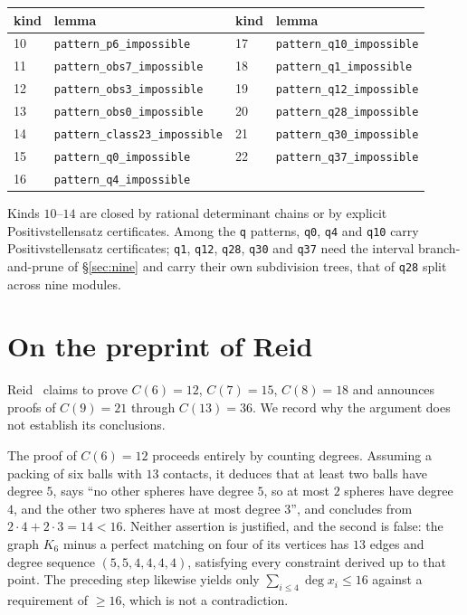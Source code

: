 \documentclass[11pt,a4paper]{article}
\theoremstyle{plain}
\theoremstyle{definition}
\begin{document}
\begin{center}
\small
\begin{tabular}{ll@{\qquad}ll}
\toprule
kind & lemma & kind & lemma \\
\midrule
10 & \texttt{pattern\_p6\_impossible}      & 17 & \texttt{pattern\_q10\_impossible} \\
11 & \texttt{pattern\_obs7\_impossible}    & 18 & \texttt{pattern\_q1\_impossible} \\
12 & \texttt{pattern\_obs3\_impossible}    & 19 & \texttt{pattern\_q12\_impossible} \\
13 & \texttt{pattern\_obs0\_impossible}    & 20 & \texttt{pattern\_q28\_impossible} \\
14 & \texttt{pattern\_class23\_impossible} & 21 & \texttt{pattern\_q30\_impossible} \\
15 & \texttt{pattern\_q0\_impossible}      & 22 & \texttt{pattern\_q37\_impossible} \\
16 & \texttt{pattern\_q4\_impossible}      &    & \\
\bottomrule
\end{tabular}
\end{center}

\noindent Kinds $10$--$14$ are closed by rational determinant chains or by explicit
Positivstellensatz certificates. Among the \texttt{q} patterns, \texttt{q0},
\texttt{q4} and \texttt{q10} carry Positivstellensatz certificates; \texttt{q1},
\texttt{q12}, \texttt{q28}, \texttt{q30} and \texttt{q37} need the interval
branch-and-prune of \S\ref{sec:nine} and carry their own subdivision trees, that of
\texttt{q28} split across nine modules.

\section{On the preprint of Reid}
\label{app:reid}

Reid~\cite{Reid2016} claims to prove $C(6)=12$, $C(7)=15$, $C(8)=18$ and announces
proofs of $C(9)=21$ through $C(13)=36$. We record why the argument does not establish
its conclusions.

The proof of $C(6)=12$ proceeds entirely by counting degrees. Assuming a packing of six
balls with $13$ contacts, it deduces that at least two balls have degree $5$, says
``no other spheres have degree $5$, so at most $2$ spheres have degree $4$, and the
other two spheres have at most degree $3$'', and concludes from $2\cdot4 + 2\cdot3 = 14
< 16$. Neither assertion is justified, and the second is false: the graph $K_6$ minus a
perfect matching on four of its vertices has $13$ edges and degree sequence
$(5,5,4,4,4,4)$, satisfying every constraint derived up to that point. The preceding
step likewise yields only $\sum_{i\le4} \deg x_i \le 16$ against a requirement of
$\ge 16$, which is not a contradiction.
\end{document}
